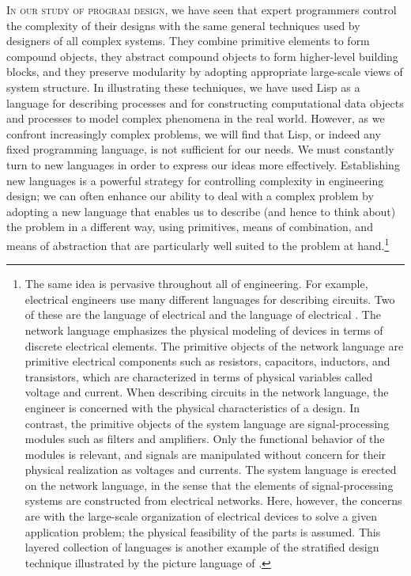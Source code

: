 \noindent
\lettrine{I}{n our study of program design}, we have seen that expert programmers control
the complexity of their designs with the same general techniques used by
designers of all complex systems.  They combine primitive elements to form
compound objects, they abstract compound objects to form higher-level building
blocks, and they preserve modularity by adopting appropriate large-scale views
of system structure.  In illustrating these techniques, we have used Lisp as a
language for describing processes and for constructing computational data
objects and processes to model complex phenomena in the real world.  However,
as we confront increasingly complex problems, we will find that Lisp, or indeed
any fixed programming language, is not sufficient for our needs.  We must
constantly turn to new languages in order to express our ideas more
effectively.  Establishing new languages is a powerful strategy for controlling
complexity in engineering design; we can often enhance our ability to deal with
a complex problem by adopting a new language that enables us to describe (and
hence to think about) the problem in a different way, using primitives, means
of combination, and means of abstraction that are particularly well suited to
the problem at hand.\footnote{The same idea is pervasive throughout all of
engineering.  For example, electrical engineers use many different languages
for describing circuits.  Two of these are the language of electrical
 and the language of electrical .  The
network language emphasizes the physical modeling of devices in terms of
discrete electrical elements.  The primitive objects of the network language
are primitive electrical components such as resistors, capacitors, inductors,
and transistors, which are characterized in terms of physical variables called
voltage and current.  When describing circuits in the network language, the
engineer is concerned with the physical characteristics of a design.  In
contrast, the primitive objects of the system language are signal-processing
modules such as filters and amplifiers.  Only the functional behavior of the
modules is relevant, and signals are manipulated without concern for their
physical realization as voltages and currents.  The system language is erected
on the network language, in the sense that the elements of signal-processing
systems are constructed from electrical networks.  Here, however, the concerns
are with the large-scale organization of electrical devices to solve a given
application problem; the physical feasibility of the parts is assumed.  This
layered collection of languages is another example of the stratified design
technique illustrated by the picture language of .}

